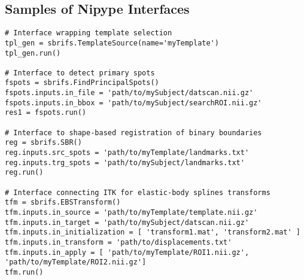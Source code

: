 \documentclass{frontiers}
\begin{document}
\subsection*{Samples of Nipype Interfaces}

\begin{lstlisting}[caption={\label{list:interfaces}\textbf{Exemplary execution
  of individual Interfaces.} %
For briefness, all the optional parameters have been omitted here, please refer
   to the project's website for full documentation.}]
# Interface wrapping template selection
tpl_gen = sbrifs.TemplateSource(name='myTemplate')
tpl_gen.run()

# Interface to detect primary spots
fspots = sbrifs.FindPrincipalSpots()
fspots.inputs.in_file = 'path/to/mySubject/datscan.nii.gz'
fspots.inputs.in_bbox = 'path/to/mySubject/searchROI.nii.gz'
res1 = fspots.run()

# Interface to shape-based registration of binary boundaries
reg = sbrifs.SBR()
reg.inputs.src_spots = 'path/to/myTemplate/landmarks.txt'
reg.inputs.trg_spots = 'path/to/mySubject/landmarks.txt'
reg.run()

# Interface connecting ITK for elastic-body splines transforms
tfm = sbrifs.EBSTransform()
tfm.inputs.in_source = 'path/to/myTemplate/template.nii.gz'
tfm.inputs.in_target = 'path/to/mySubject/datscan.nii.gz'
tfm.inputs.in_initialization = [ 'transform1.mat', 'transform2.mat' ]
tfm.inputs.in_transform = 'path/to/displacements.txt'
tfm.inputs.in_apply = [ 'path/to/myTemplate/ROI1.nii.gz', 'path/to/myTemplate/ROI2.nii.gz']
tfm.run()
\end{lstlisting}
\end{document}
